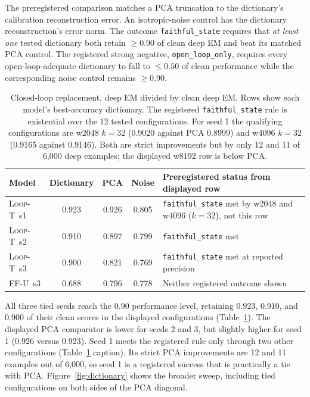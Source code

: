 \documentclass[10pt,letterpaper]{article}
\newcommand{\LoopT}{\textsc{Loop-T}}
\newcommand{\FFU}{\textsc{FF-U}}
\begin{document}
The preregistered comparison matches a PCA truncation to the dictionary's calibration reconstruction error. An isotropic-noise control has the dictionary reconstruction's error norm. The outcome \texttt{faithful\_state} requires that \emph{at least one} tested dictionary both retain $\geq0.90$ of clean deep EM and beat its matched PCA control. The registered strong negative, \texttt{open\_loop\_only}, requires every open-loop-adequate dictionary to fall to $\leq0.50$ of clean performance while the corresponding noise control remains $\geq0.90$.

\begin{table}[t]
\centering
\small
\begin{tabularx}{\linewidth}{@{}lccc>{\raggedright\arraybackslash}X@{}}
\toprule
Model & Dictionary & PCA & Noise & Preregistered status from displayed row \\
\midrule
\LoopT\ s1 & 0.923 & 0.926 & 0.805 & \texttt{faithful\_state} met by w2048 and w4096 ($k=32$), not this row \\
\LoopT\ s2 & 0.910 & 0.897 & 0.799 & \texttt{faithful\_state} met \\
\LoopT\ s3 & 0.900 & 0.821 & 0.769 & \texttt{faithful\_state} met at reported precision \\
\FFU\ s3 & 0.688 & 0.796 & 0.778 & Neither registered outcome shown \\
\bottomrule
\end{tabularx}
\caption{Closed-loop replacement, deep EM divided by clean deep EM. Rows show each model's best-accuracy dictionary. The registered \texttt{faithful\_state} rule is existential over the 12 tested configurations. For seed 1 the qualifying configurations are w2048 $k{=}32$ (0.9020 against PCA 0.8999) and w4096 $k{=}32$ (0.9165 against 0.9146). Both are strict improvements but by only 12 and 11 of 6{,}000 deep examples; the displayed w8192 row is below PCA.}
\label{tab:dictionary}
\end{table}

All three tied seeds reach the $0.90$ performance level, retaining 0.923, 0.910, and 0.900 of their clean scores in the displayed configurations (Table~\ref{tab:dictionary}). The displayed PCA comparator is lower for seeds 2 and 3, but slightly higher for seed 1 (0.926 versus 0.923). Seed 1 meets the registered rule only through two other configurations (Table~\ref{tab:dictionary} caption). Its strict PCA improvements are 12 and 11 examples out of 6{,}000, so seed 1 is a registered success that is practically a tie with PCA. Figure~\ref{fig:dictionary} shows the broader sweep, including tied configurations on both sides of the PCA diagonal.
\end{document}
